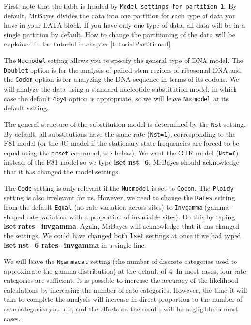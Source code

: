 \documentclass[12pt]{book}
\begin{document}
First, note that the table is headed by \texttt{Model settings for partition 1}. By default, MrBayes divides
 the data into one partition for each type of data you have in your DATA block. If you have only one type of
 data, all data will be in a single partition by default. How to change the partitioning of the data will be
 explained in the tutorial in chapter \ref{tutorialPartitioned}.

The \texttt{Nucmodel} setting allows you to specify the general type of DNA model. The \texttt{Doublet}
 option is for the analysis of paired stem regions of ribosomal DNA and the \texttt{Codon} option is for
 analyzing the DNA sequence in terms of its codons. We will analyze the data using a standard nucleotide
 substitution model, in which case the default \texttt{4by4} option is appropriate, so we will leave
 \texttt{Nucmodel} at its default setting.

The general structure of the substitution model is determined by the \texttt{Nst} setting. By default, all
 substitutions have the same rate (\texttt{Nst=1}), corresponding to the F81 model (or the JC model if the
 stationary state frequencies are forced to be equal using the \texttt{prset} command, see below). We want
 the GTR model (\texttt{Nst=6}) instead of the F81 model so we type \textbf{lset nst=6}. MrBayes should
 acknowledge that it has changed the model settings.

The \texttt{Code} setting is only relevant if the \texttt{Nucmodel} is set to \texttt{Codon}.
 The \texttt{Ploidy} setting is also irrelevant for us. However, we need to change the \texttt{Rates}
 setting from the default \texttt{Equal} (no rate variation across sites) to \texttt{Invgamma}
 (gamma-shaped rate variation with a proportion of invariable sites). Do this by typing
 \textbf{lset rates=invgamma}. Again, MrBayes will acknowledge that it has changed the settings. We could
 have changed both \texttt{lset} settings at once if we had typed \textbf{lset nst=6 rates=invgamma} in a
 single line.

We will leave the \texttt{Ngammacat} setting (the number of discrete categories used to approximate the
 gamma distribution) at the default of 4. In most cases, four rate categories are sufficient. It is
 possible to increase the accuracy of the likelihood calculations by increasing the number of rate
 categories. However, the time it will take to complete the analysis will increase in direct proportion
 to the number of rate categories you use, and the effects on the results will be negligible in most cases.
\end{document}
